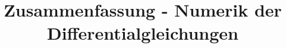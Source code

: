 \documentclass[a4paper,11pt,DIV0]{scrreprt}
\theoremstyle{definition}
\begin{document}
\title{Zusammenfassung - Numerik der Differentialgleichungen}
\author{}
\date{}
\maketitle
\newpage




\end{document}
